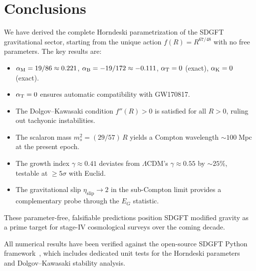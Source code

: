 \documentclass[amsmath,amssymb,aps,prd,twocolumn,superscriptaddress,nofootinbib]{revtex4-2}
\begin{document}
\section{Conclusions}
\label{sec:conclusions}

We have derived the complete Horndeski parametrization of the SDGFT
gravitational sector, starting from the unique action
$f(R) = R^{67/48}$ with no free parameters.  The key results are:

\begin{itemize}
  \item $\alpha_{\mathrm{M}} = 19/86 \approx 0.221$, $\alpha_{\mathrm{B}} = -19/172 \approx -0.111$,
    $\alpha_{\mathrm{T}} = 0$ (exact), $\alpha_{\mathrm{K}} = 0$ (exact).

  \item $\alpha_{\mathrm{T}} = 0$ ensures automatic compatibility with GW170817.

  \item The Dolgov--Kawasaki condition $f''(R) > 0$ is satisfied
    for all $R > 0$, ruling out tachyonic instabilities.

  \item The scalaron mass $m_s^2 = (29/57)\,R$ yields a
    Compton wavelength $\sim 100\;\mathrm{Mpc}$ at the present
    epoch.

  \item The growth index $\gamma \approx 0.41$ deviates from
    $\Lambda$CDM's $\gamma \approx 0.55$ by $\sim 25\%$, testable
    at $\geq 5\sigma$ with Euclid.

  \item The gravitational slip $\eta_{\mathrm{slip}} \to 2$ in the
    sub-Compton limit provides a complementary probe through the
    $E_G$ statistic.
\end{itemize}

These parameter-free, falsifiable predictions position SDGFT
modified gravity as a prime target for stage-IV cosmological
surveys over the coming decade.

\begin{acknowledgments}
All numerical results have been verified against the open-source
SDGFT Python framework~\cite{Besemer_Code}, which includes
dedicated unit tests for the Horndeski parameters and
Dolgov--Kawasaki stability analysis.
\end{acknowledgments}

\end{document}
